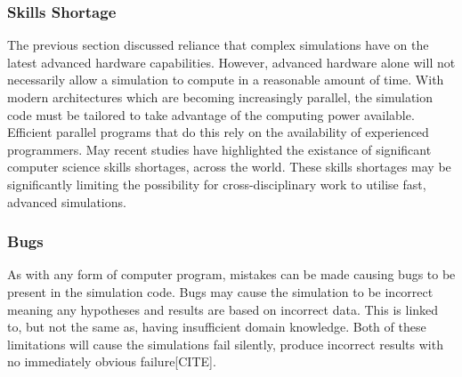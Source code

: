 \documentclass{UoYCSproject}
\begin{document}


\subsubsection{Skills Shortage}
\label{skills_shortage}
The previous section discussed reliance that complex simulations have on the latest advanced hardware capabilities.
However, advanced hardware alone will not necessarily allow a simulation to compute in a reasonable amount of time. 
With modern architectures which are becoming increasingly parallel, the simulation code must be tailored to take advantage of the computing power available.
Efficient parallel programs that do this rely on the availability of experienced programmers.
May recent studies have highlighted the existance of significant computer science skills shortages, across the world\cite{digital_skills_uk, microsoft_blog}.
These skills shortages may be significantly limiting the possibility for cross-disciplinary work to utilise fast, advanced simulations.




\subsubsection{Bugs}
As with any form of computer program, mistakes can be made causing bugs to be present in the simulation code.
Bugs may cause the simulation to be incorrect meaning any hypotheses and results are based on incorrect data.
This is linked to, but not the same as, having insufficient domain knowledge.
Both of these limitations will cause the simulations fail silently, produce incorrect results with no immediately obvious failure[CITE].
\end{document}
